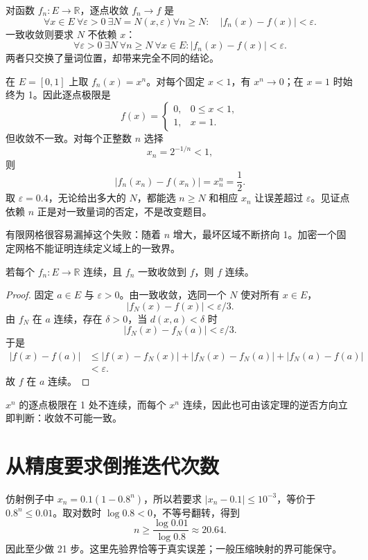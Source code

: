 对函数 $f_n:E\to\mathbb R$，逐点收敛 $f_n\to f$ 是
\[
 \forall x\in E\ \forall\varepsilon>0\ \exists N=N(x,\varepsilon)
 \forall n\geq N:\quad |f_n(x)-f(x)|<\varepsilon.
\]
一致收敛则要求 $N$ 不依赖 $x$：
\[
 \forall\varepsilon>0\ \exists N\ \forall n\geq N\ \forall x\in E:
 |f_n(x)-f(x)|<\varepsilon.
\]
两者只交换了量词位置，却带来完全不同的结论。


在 $E=[0,1]$ 上取 $f_n(x)=x^n$。对每个固定 $x<1$，有 $x^n\to0$；在 $x=1$ 时始终为 1。因此逐点极限是
\[
f(x)=\begin{cases}0,&0\leq x<1,\\1,&x=1.\end{cases}
\]
但收敛不一致。对每个正整数 $n$ 选择
\[
 x_n=2^{-1/n}<1,
\]
则
\[
 |f_n(x_n)-f(x_n)|=x_n^n=\frac12.
\]
取 $\varepsilon=0.4$，无论给出多大的 $N$，都能选 $n\geq N$ 和相应 $x_n$ 让误差超过 $\varepsilon$。见证点依赖 $n$ 正是对一致量词的否定，不是改变题目。

有限网格很容易漏掉这个失败：随着 $n$ 增大，最坏区域不断挤向 1。加密一个固定网格不能证明连续定义域上的一致界。


\begin{theorem}
若每个 $f_n:E\to\mathbb R$ 连续，且 $f_n$ 一致收敛到 $f$，则 $f$ 连续。
\end{theorem}

\begin{proof}
固定 $a\in E$ 与 $\varepsilon>0$。由一致收敛，选同一个 $N$ 使对所有 $x\in E$，
\[
 |f_N(x)-f(x)|<\varepsilon/3.
\]
由 $f_N$ 在 $a$ 连续，存在 $\delta>0$，当 $d(x,a)<\delta$ 时
\[
 |f_N(x)-f_N(a)|<\varepsilon/3.
\]
于是
\[
\begin{aligned}
|f(x)-f(a)|
&\leq|f(x)-f_N(x)|+|f_N(x)-f_N(a)|+|f_N(a)-f(a)|\\
&<\varepsilon.
\end{aligned}
\]
故 $f$ 在 $a$ 连续。
\end{proof}

$x^n$ 的逐点极限在 1 处不连续，而每个 $x^n$ 连续，因此也可由该定理的逆否方向立即判断：收敛不可能一致。

\section{从精度要求倒推迭代次数}
仿射例子中 $x_n=0.1(1-0.8^n)$，所以若要求 $|x_n-0.1|\leq10^{-3}$，等价于 $0.8^n\leq0.01$。取对数时 $\log0.8<0$，不等号翻转，得到
\[
 n\geq\frac{\log0.01}{\log0.8}\approx20.64.
\]
因此至少做 21 步。这里先验界恰等于真实误差；一般压缩映射的界可能保守。


